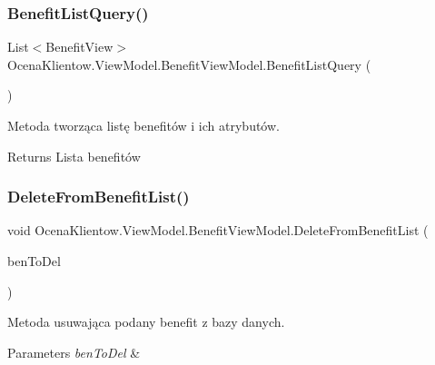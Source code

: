 \subsubsection{\texorpdfstring{Benefit\+List\+Query()}{BenefitListQuery()}}
{\footnotesize\ttfamily List$<$Benefit\+View$>$ Ocena\+Klientow.\+View\+Model.\+Benefit\+View\+Model.\+Benefit\+List\+Query (\begin{DoxyParamCaption}{ }\end{DoxyParamCaption})\hspace{0.3cm}{\ttfamily [inline]}}



Metoda tworząca listę benefitów i ich atrybutów. 

\begin{DoxyReturn}{Returns}
Lista benefitów
\end{DoxyReturn}
\hypertarget{class_ocena_klientow_1_1_view_model_1_1_benefit_view_model_a2da1cc3a788a6f592199b90410159abe}{}\label{class_ocena_klientow_1_1_view_model_1_1_benefit_view_model_a2da1cc3a788a6f592199b90410159abe} 
\subsubsection{\texorpdfstring{Delete\+From\+Benefit\+List()}{DeleteFromBenefitList()}}
{\footnotesize\ttfamily void Ocena\+Klientow.\+View\+Model.\+Benefit\+View\+Model.\+Delete\+From\+Benefit\+List (\begin{DoxyParamCaption}\item[{Benefit\+View}]{ben\+To\+Del }\end{DoxyParamCaption})\hspace{0.3cm}{\ttfamily [inline]}}



Metoda usuwająca podany benefit z bazy danych. 


\begin{DoxyParams}{Parameters}
{\em ben\+To\+Del} & \\
\hline
\end{DoxyParams}
\hypertarget{class_ocena_klientow_1_1_view_model_1_1_benefit_view_model_ab5199fb111e34d97534ad2d188610b93}{}\label{class_ocena_klientow_1_1_view_model_1_1_benefit_view_model_ab5199fb111e34d97534ad2d188610b93} 
